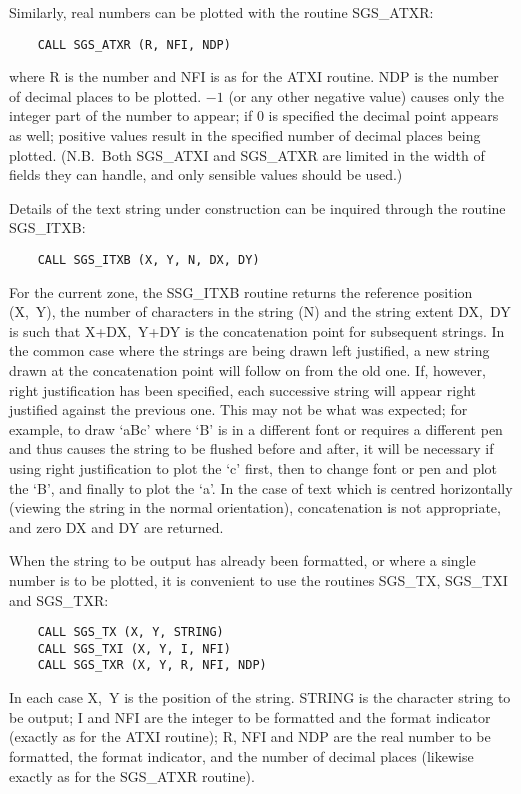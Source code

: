 Similarly, real numbers can be plotted with the routine SGS\_ATXR:
\begin{verbatim}
    CALL SGS_ATXR (R, NFI, NDP)
\end{verbatim}
where R is the number and NFI is as for the ATXI routine.  NDP is
the number of decimal places to be plotted.  $-1$ (or any other negative
value) causes only the integer part of the number to appear;  if 0 is
specified the decimal point appears as well;  positive values result
in the specified number of decimal places being plotted.
(N.B.\ Both SGS\_ATXI and SGS\_ATXR are limited in the width of fields they
can handle, and only sensible values should be used.)

Details of the text string under construction can be inquired
through the routine SGS\_ITXB:
\begin{verbatim}
    CALL SGS_ITXB (X, Y, N, DX, DY)
\end{verbatim}
For the current zone, the SSG\_ITXB
routine returns the reference position (X,~Y),
the number of characters in the string (N) and
the string extent DX,~DY is such that X+DX,~Y+DY is the concatenation
point for subsequent strings.  In the common case where the strings
are being drawn left justified, a new string drawn at the concatenation
point will follow on from the old one.  If, however, right justification
has been specified, each successive string will appear right justified
against the previous one.  This may not be what was expected;  for
example, to draw `aBc' where `B' is in a different font or requires a
different pen and thus causes the string to be flushed before and after,
it will be necessary if using right justification to plot the `c'
first, then to change font or pen and plot the `B', and finally to plot
the `a'.  In the case of text which is centred horizontally (viewing
the string in the normal orientation), concatenation is not appropriate,
and zero DX and DY are returned.

When the string to be output has already been formatted, or where
a single number is to be plotted, it is convenient to use the
routines SGS\_TX, SGS\_TXI and SGS\_TXR:
\begin{verbatim}
    CALL SGS_TX (X, Y, STRING)
    CALL SGS_TXI (X, Y, I, NFI)
    CALL SGS_TXR (X, Y, R, NFI, NDP)
\end{verbatim}
In each case X,~Y is the position of the string.  STRING is the
character string to be output;  I and NFI are the integer to be
formatted and the format indicator (exactly as for the ATXI
routine);  R, NFI and NDP are the real number to be formatted,
the format indicator, and the number of decimal places (likewise
exactly as for the SGS\_ATXR routine).

